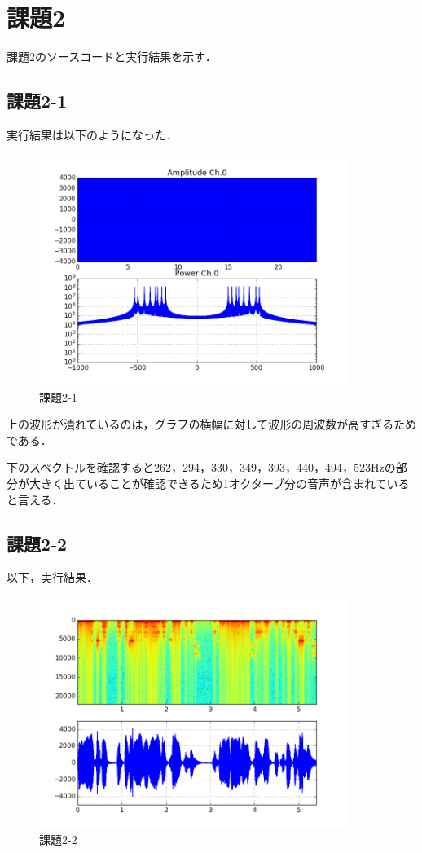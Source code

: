 \section{課題2}
課題2のソースコードと実行結果を示す．


\subsection{課題2-1}

実行結果は以下のようになった．

\begin{figure}[h]
  \begin{center}
    \includegraphics[width=10cm]{./img/kadai2-1.png}
    \caption{課題2-1}
  \end{center}
\end{figure}

上の波形が潰れているのは，グラフの横幅に対して波形の周波数が高すぎるためである．

下のスペクトルを確認すると262，294，330，349，393，440，494，523Hzの部分が大きく出ていることが確認できるため1オクターブ分の音声が含まれていると言える．


\subsection{課題2-2}


以下，実行結果．

\begin{figure}[h]
  \begin{center}
    \includegraphics[width=10cm]{./img/kadai2-2.png}
    \caption{課題2-2}
  \end{center}
\end{figure}

